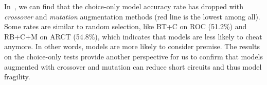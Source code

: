 In~, we can find that the choice-only model accuracy rate has dropped 
with \textit{crossover} and \textit{mutation} augmentation methods (red line is the lowest among all). 
Some rates are similar to random selection, like BT+C on ROC (51.2\%) 
and RB+C+M on ARCT (54.8\%), which indicates that models are less 
likely to cheat anymore. 
In other words, models are more likely to consider premise. 
The results on the choice-only tests provide another perspective for us
to confirm that models augmented with crossover and mutation can reduce
short circuits and thus model fragility.


